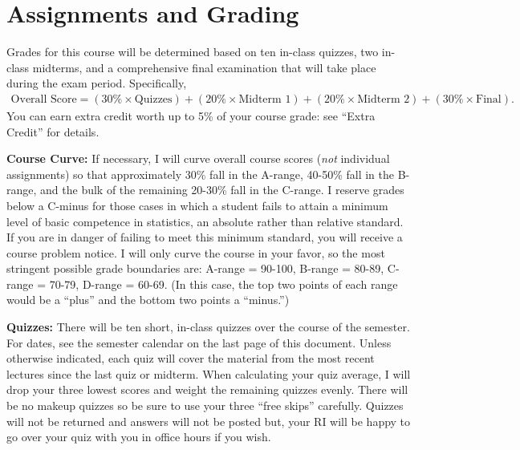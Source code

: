 \documentclass[11pt, letterpaper]{article}
\begin{document}
\section*{Assignments and Grading}

Grades for this course will be determined based on ten in-class quizzes, two in-class midterms, and a comprehensive final examination that will take place during the exam period.
Specifically,
	\begin{equation*}
	\begin{split}
		\mbox{Overall Score} = (30\% \times \mbox{Quizzes})  + (20\% \times \mbox{Midterm 1}) + (20\% \times \mbox{Midterm 2}) + (30\% \times \mbox{Final}).
	\end{split}
	\end{equation*}
You can earn extra credit worth up to 5\% of your course grade: see ``Extra Credit'' for details.

\medskip 

\noindent \textbf{Course Curve:}
If necessary, I will curve overall course scores (\emph{not} individual assignments) so that approximately 30\% fall in the A-range, 40-50\% fall in the B-range, and the bulk of the remaining 20-30\% fall in the C-range. 
I reserve grades below a C-minus for those cases in which a student fails to attain a minimum level of basic competence in statistics, an absolute rather than relative standard. 
If you are in danger of failing to meet this minimum standard, you will receive a course problem notice.
I will only curve the course in your favor, so the most stringent possible grade boundaries are: A-range = 90-100, B-range = 80-89, C-range = 70-79, D-range = 60-69.
(In this case, the top two points of each range would be a ``plus'' and the bottom two points a ``minus.'')

\medskip


\noindent \textbf{Quizzes:} 
There will be ten short, in-class quizzes over the course of the semester.
For dates, see the semester calendar on the last page of this document.
Unless otherwise indicated, each quiz will cover the material from the most recent lectures since the last quiz or midterm.
When calculating your quiz average, I will drop your three lowest scores and weight the remaining quizzes evenly. 
There will be no makeup quizzes so be sure to use your three ``free skips'' carefully.
Quizzes will not be returned and answers will not be posted but, your RI will be happy to go over your quiz with you in office hours if you wish. 

\medskip
\end{document}
